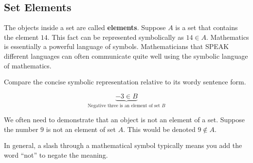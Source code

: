 \subsection{Set Elements}

The objects inside a set are called \textbf{elements}. Suppose $A$ is a set that contains the element $14$. This fact can be represented symbolically as $14 \in A$. Mathematics is essentially a powerful language of symbols. Mathematicians that SPEAK different languages can often communicate quite well using the symbolic language of mathematics.

Compare the concise symbolic representation relative to its wordy sentence form.

\[
\underbrace{-3 \in B}_{\text{Negative three is an element of set $B$}}
\]

We often need to demonstrate that an object is not an element of a set. Suppose the number $9$ is not an element of set $A$. This would be denoted $9 \notin A$.

In general, a slash through a mathematical symbol typically means you add the word ``not'' to negate the meaning.

